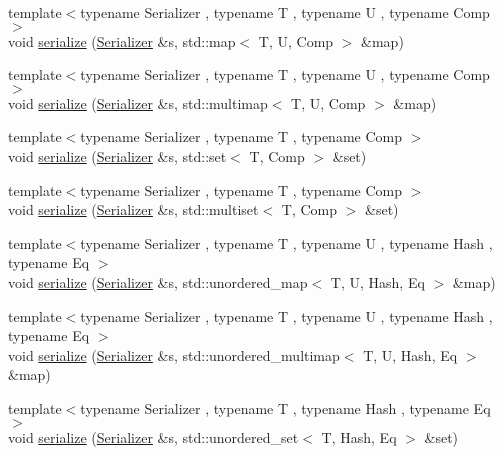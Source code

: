 \begin{DoxyCompactItemize}
{\footnotesize template$<$typename Serializer , typename T , typename U , typename Comp $>$ }\\void \hyperlink{namespacecheckpoint_a39ee0888319dc204dff7af20dd1e8238}{serialize} (\hyperlink{structcheckpoint_1_1_serializer}{Serializer} \&s, std\+::map$<$ T, U, Comp $>$ \&map)
\item 
{\footnotesize template$<$typename Serializer , typename T , typename U , typename Comp $>$ }\\void \hyperlink{namespacecheckpoint_a44434f578fc304afa3a62a9305be2a65}{serialize} (\hyperlink{structcheckpoint_1_1_serializer}{Serializer} \&s, std\+::multimap$<$ T, U, Comp $>$ \&map)
\item 
{\footnotesize template$<$typename Serializer , typename T , typename Comp $>$ }\\void \hyperlink{namespacecheckpoint_a9f1869781f4cce4db94c144174680b24}{serialize} (\hyperlink{structcheckpoint_1_1_serializer}{Serializer} \&s, std\+::set$<$ T, Comp $>$ \&set)
\item 
{\footnotesize template$<$typename Serializer , typename T , typename Comp $>$ }\\void \hyperlink{namespacecheckpoint_ae032265314cdf8e9155a6bbc423ca1c9}{serialize} (\hyperlink{structcheckpoint_1_1_serializer}{Serializer} \&s, std\+::multiset$<$ T, Comp $>$ \&set)
\item 
{\footnotesize template$<$typename Serializer , typename T , typename U , typename Hash , typename Eq $>$ }\\void \hyperlink{namespacecheckpoint_a9fc2f3eb20d3ce8d6145e99a2559ea58}{serialize} (\hyperlink{structcheckpoint_1_1_serializer}{Serializer} \&s, std\+::unordered\+\_\+map$<$ T, U, Hash, Eq $>$ \&map)
\item 
{\footnotesize template$<$typename Serializer , typename T , typename U , typename Hash , typename Eq $>$ }\\void \hyperlink{namespacecheckpoint_aa77eeb7a036d253ef33ed2c9ef764a5e}{serialize} (\hyperlink{structcheckpoint_1_1_serializer}{Serializer} \&s, std\+::unordered\+\_\+multimap$<$ T, U, Hash, Eq $>$ \&map)
\item 
{\footnotesize template$<$typename Serializer , typename T , typename Hash , typename Eq $>$ }\\void \hyperlink{namespacecheckpoint_ae4ca8cbc6daf2f5a2a20d44d9fe1cc9f}{serialize} (\hyperlink{structcheckpoint_1_1_serializer}{Serializer} \&s, std\+::unordered\+\_\+set$<$ T, Hash, Eq $>$ \&set)
\item 

\end{DoxyCompactItemize}
